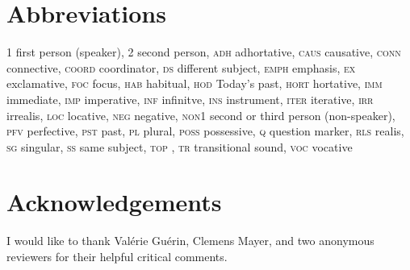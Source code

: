 \documentclass[output=paper]{LSP/langsci}
\begin{document}
			
			
\section*{Abbreviations}


\textsc{1}		first person (speaker),
\textsc{2}		second person,
\textsc{adh}		adhortative,
\textsc{caus}		causative,
\textsc{conn	}							connective,
\textsc{coord  }							coordinator,
\textsc{ds	}									different subject,
\textsc{emph}								emphasis,
\textsc{ex	}									exclamative,
\textsc{foc }									focus,
\textsc{hab	}								habitual,
\textsc{hod	}								Today’s past,
\textsc{hort}						   		hortative,
\textsc{imm	}								immediate,
\textsc{imp	}									imperative,
\textsc{inf	}									infinitve,
\textsc{ins	}									instrument,
\textsc{iter}									iterative,
\textsc{irr	}									irrealis,
\textsc{loc	}								locative,
\textsc{neg	}								negative,
\textsc{non1}								second or third person (non-speaker),
\textsc{pfv	}								perfective,
\textsc{pst	}									past,
\textsc{pl	}									plural,
\textsc{poss}									possessive,
\textsc{q}											question marker,
\textsc{rls	}								realis,
\textsc{sg	}									singular,
\textsc{ss	}									same subject,
\textsc{top	}								,
\textsc{tr	}									transitional sound,
\textsc{voc}									vocative


\section*{Acknowledgements}
I would like to thank Valérie Guérin, Clemens Mayer, and two anonymous reviewers for their helpful critical comments.



\printbibliography[heading=subbibliography,notkeyword=this]
\end{document}
